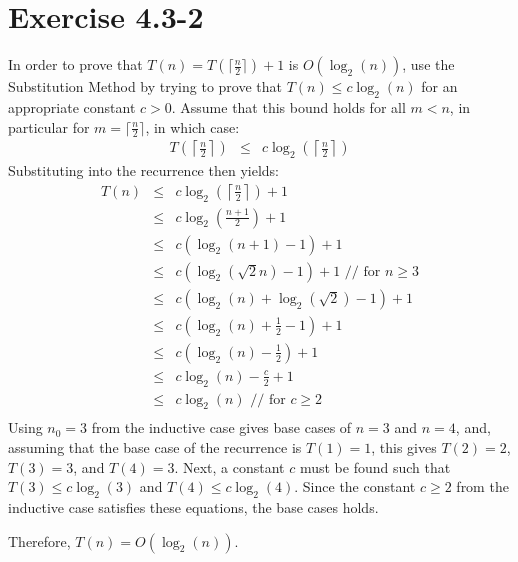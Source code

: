 \documentclass{article}
\begin{document}
\section*{Exercise 4.3-2}

In order to prove that $T(n) = T(\lceil \frac{n}{2} \rceil) + 1$ is $O(\log_2(n))$, use the Substitution Method by trying to prove that $T(n) \leq c \log_2(n)$ for an appropriate constant $c > 0$.
Assume that this bound holds for all $m < n$, in particular for $m = \lceil \frac{n}{2} \rceil$, in which case:
\begin{eqnarray*}
	T\left(\left\lceil \frac{n}{2} \right\rceil\right) &\leq& c \log_2\left(\left\lceil \frac{n}{2} \right\rceil\right)
\end{eqnarray*}
Substituting into the recurrence then yields:
\begin{eqnarray*}
	T(n) &\leq& c\log_2\left(\left\lceil \frac{n}{2} \right\rceil\right) + 1 \\
	 &\leq& c\log_2\left(\frac{n + 1}{2}\right) + 1 \\
	 &\leq& c(\log_2(n + 1) - 1) + 1 \\
	 &\leq& c\left(\log_2\left(\sqrt{2}n\right) - 1\right) + 1 \text{  // for $n \geq 3$} \\
	 &\leq& c\left(\log_2\left(n\right) + \log_2\left(\sqrt{2}\right) - 1\right) + 1 \\
	 &\leq& c\left(\log_2\left(n\right) + \frac{1}{2} - 1\right) + 1 \\
	 &\leq& c\left(\log_2\left(n\right) - \frac{1}{2}\right) + 1 \\
	 &\leq& c\log_2(n) - \frac{c}{2} + 1 \\
	 &\leq& c\log_2(n) \text{  // for $c \geq 2$} \\
\end{eqnarray*}
Using $n_0 = 3$ from the inductive case gives base cases of $n = 3$ and $n = 4$, and, assuming that the base case of the recurrence is $T(1) = 1$, this gives $T(2) = 2$, $T(3) = 3$, and $T(4) = 3$.
Next, a constant $c$ must be found such that $T(3) \leq c \log_2(3)$ and $T(4) \leq c \log_2(4)$.
Since the constant $c \geq 2$ from the inductive case satisfies these equations, the base cases holds.

Therefore, $T(n) = O(\log_2(n))$.
\end{document}
